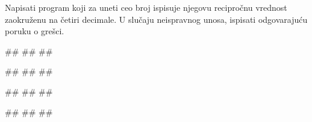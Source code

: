 \begin{Exercise}[label=KT_NG_03] 
Napisati program koji za uneti ceo broj ispisuje njegovu recipročnu vrednost zaokruženu na četiri decimale. 
U slučaju neispravnog unosa, ispisati odgovarajuću poruku o grešci.

\begin{miditest}
\begin{upotreba}{1}
#\naslovInt#
##
##
\end{upotreba}
\end{miditest}
\begin{miditest}
\begin{upotreba}{2}
#\naslovInt#
##
##
\end{upotreba}
\end{miditest}

\begin{miditest}
\begin{upotreba}{3}
#\naslovInt#
##
##
\end{upotreba}
\end{miditest}
\begin{miditest}
\begin{upotreba}{4}
#\naslovInt#
##
##
\end{upotreba}
\end{miditest}

\end{Exercise}
\ifresenja
 \begin{Answer}[ref=KT_NG_03]
\end{Answer}
\fi



